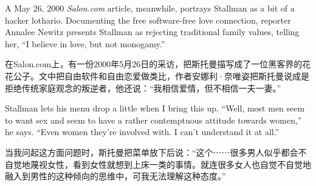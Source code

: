 \ifdefined\eng
A May 26, 2000 \textit{Salon.com} article, meanwhile, portrays Stallman as a bit of a hacker lothario. Documenting the free software-free love connection, reporter Annalee Newitz presents Stallman as rejecting traditional family values, telling her, ``I believe in love, but not monogamy.''
\fi

\ifdefined\chs
在Salon.com上，有一份2000年5月26日的采访，把斯托曼描写成了一位黑客界的花花公子。文中把自由软件和自由恋爱做类比，作者安娜利·奈唯姿把斯托曼说成是拒绝传统家庭观念的叛逆者，他还说：``我相信爱情，但不相信一夫一妻。''
\fi

\ifdefined\eng
Stallman lets his menu drop a little when I bring this up. ``Well, most men seem to want sex and seem to have a rather contemptuous attitude towards women,'' he says. ``Even women they're involved with. I can't understand it at all.''
\fi

\ifdefined\chs
当我问起这方面问题时，斯托曼把菜单放下后说：``这个⋯⋯很多男人似乎都会不自觉地蔑视女性，看到女性就想到上床一类的事情。就连很多女人也自觉不自觉地融入到男性的这种倾向的思维中，可我无法理解这种态度。''
\fi

